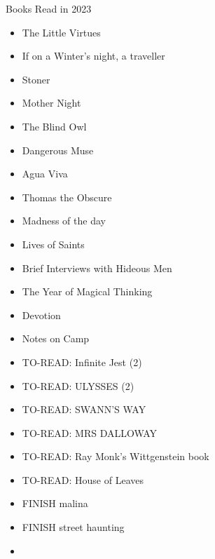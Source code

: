 Books Read in 2023
\begin{itemize}
    \item The Little Virtues
    \item If on a Winter's night, a traveller
    \item Stoner
    \item Mother Night
    \item The Blind Owl
    \item Dangerous Muse
    \item Agua Viva
    \item Thomas the Obscure
    \item Madness of the day
    \item Lives of Saints
    \item Brief Interviews with Hideous Men
    \item The Year of Magical Thinking
    \item Devotion
    \item Notes on Camp
    \item TO-READ: Infinite Jest (2)
    \item TO-READ: ULYSSES (2)
    \item TO-READ: SWANN'S WAY
    \item TO-READ: MRS DALLOWAY
    \item TO-READ: Ray Monk's Wittgenstein book
    \item TO-READ: House of Leaves
    \item FINISH malina
    \item FINISH street haunting
    \item 
\end{itemize}
